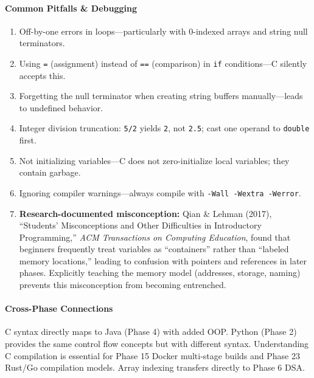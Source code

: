\documentclass[11pt, a4paper, oneside]{report}
\begin{document}
\paragraph{Common Pitfalls \& Debugging}
\begin{enumerate}[leftmargin=*]
\item Off-by-one errors in loops---particularly with 0-indexed arrays and string null terminators.
\item Using \texttt{=} (assignment) instead of \texttt{==} (comparison) in \texttt{if} conditions---C silently accepts this.
\item Forgetting the null terminator when creating string buffers manually---leads to undefined behavior.
\item Integer division truncation: \texttt{5/2} yields \texttt{2}, not \texttt{2.5}; cast one operand to \texttt{double} first.
\item Not initializing variables---C does not zero-initialize local variables; they contain garbage.
\item Ignoring compiler warnings---always compile with \texttt{-Wall -Wextra -Werror}.

\item \textbf{Research-documented misconception:} Qian \& Lehman (2017), ``Students' Misconceptions and Other Difficulties in Introductory Programming,'' \emph{ACM Transactions on Computing Education}, found that beginners frequently treat variables as ``containers'' rather than ``labeled memory locations,'' leading to confusion with pointers and references in later phases. Explicitly teaching the memory model (addresses, storage, naming) prevents this misconception from becoming entrenched.
\end{enumerate}

\paragraph{Cross-Phase Connections} C syntax directly maps to Java (Phase 4) with added OOP. Python (Phase 2) provides the same control flow concepts but with different syntax. Understanding C compilation is essential for Phase 15 Docker multi-stage builds and Phase 23 Rust/Go compilation models. Array indexing transfers directly to Phase 6 DSA.
\end{document}
